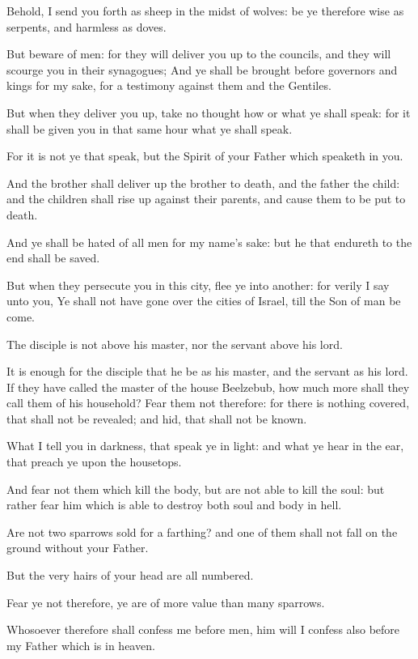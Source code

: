 \verse Behold, I send you forth as sheep in the midst of wolves: be ye therefore wise as serpents, and harmless as doves.

\verse But beware of men: for they will deliver you up to the councils, and they will scourge you in their synagogues; \verse And ye shall be brought before governors and kings for my sake, for a testimony against them and the Gentiles.

\verse But when they deliver you up, take no thought how or what ye shall speak: for it shall be given you in that same hour what ye shall speak.

\verse For it is not ye that speak, but the Spirit of your Father which speaketh in you.

\verse And the brother shall deliver up the brother to death, and the father the child: and the children shall rise up against their parents, and cause them to be put to death.

\verse And ye shall be hated of all men for my name's sake: but he that endureth to the end shall be saved.

\verse But when they persecute you in this city, flee ye into another: for verily I say unto you, Ye shall not have gone over the cities of Israel, till the Son of man be come.

\verse The disciple is not above his master, nor the servant above his lord.

\verse It is enough for the disciple that he be as his master, and the servant as his lord. If they have called the master of the house Beelzebub, how much more shall they call them of his household?  \verse Fear them not therefore: for there is nothing covered, that shall not be revealed; and hid, that shall not be known.

\verse What I tell you in darkness, that speak ye in light: and what ye hear in the ear, that preach ye upon the housetops.

\verse And fear not them which kill the body, but are not able to kill the soul: but rather fear him which is able to destroy both soul and body in hell.

\verse Are not two sparrows sold for a farthing? and one of them shall not fall on the ground without your Father.

\verse But the very hairs of your head are all numbered.

\verse Fear ye not therefore, ye are of more value than many sparrows.

\verse Whosoever therefore shall confess me before men, him will I confess also before my Father which is in heaven.

